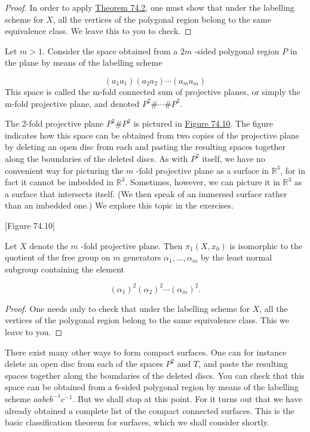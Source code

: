 \begin{proof}
	In order to apply \hyperref[thm:74.2]{Theorem 74.2}, one must show that under the labelling scheme for \(X\), all the vertices of the polygonal region belong to the same equivalence class. We leave this to you to check.
\end{proof}
\begin{definition}
	Let \(m > 1\). Consider the space obtained from a \({2m}\) -sided polygonal region \(P\) in the plane by means of the labelling scheme

\[
( {a_{1}a_{1}}) ( {a_{2}a_{2}}) \cdots ( {a_{m}a_{m}})
\]
This space is called the m-fold connected sum of projective planes, or simply the m-fold projective plane, and denoted \(P^{2}\# \cdots \# P^{2}\).
\end{definition}

The 2-fold projective plane \(P^{2}\# P^{2}\) is pictured in \hyperref[fig:74.10]{Figure 74.10}. The figure indicates how this space can be obtained from two copies of the projective plane by deleting an open disc from each and pasting the resulting spaces together along the boundaries of the deleted discs. As with \(P^{2}\) itself, we have no convenient way for picturing the \(m\) -fold projective plane as a surface in \(\mathbb{R}^{3}\), for in fact it cannot be imbedded in \(\mathbb{R}^{3}\). Sometimes, however, we can picture it in \(\mathbb{R}^{3}\) as a surface that intersects itself. (We then speak of an immersed surface rather than an imbedded one.) We explore this topic in the exercises.

[Figure 74.10]
\begin{theorem}
\label{thm:\thetheorem}
	Let \(X\) denote the \(m\) -fold projective plane. Then \({\pi }_{1}( {X,x_{0}})\) is isomorphic to the quotient of the free group on \(m\) generators \({\alpha }_{1},\ldots ,{\alpha }_{m}\) by the least normal subgroup containing the element

\[
{( {\alpha }_{1}) }^{2}{( {\alpha }_{2}) }^{2}\cdots {( {\alpha }_{m}) }^{2}.
\]

\begin{proof}
	One needs only to check that under the labelling scheme for \(X\), all the vertices of the polygonal region belong to the same equivalence class. This we leave to you.
\end{proof}

There exist many other ways to form compact surfaces. One can for instance delete an open disc from each of the spaces \(P^{2}\) and \(T\), and paste the resulting spaces together along the boundaries of the deleted discs. You can check that this space can be obtained from a 6-sided polygonal region by means of the labelling scheme \({aabc}b^{-1}c^{-1}\). But we shall stop at this point. For it turns out that we have already obtained a complete list of the compact connected surfaces. This is the basic classification theorem for surfaces, which we shall consider shortly.
\end{theorem}
